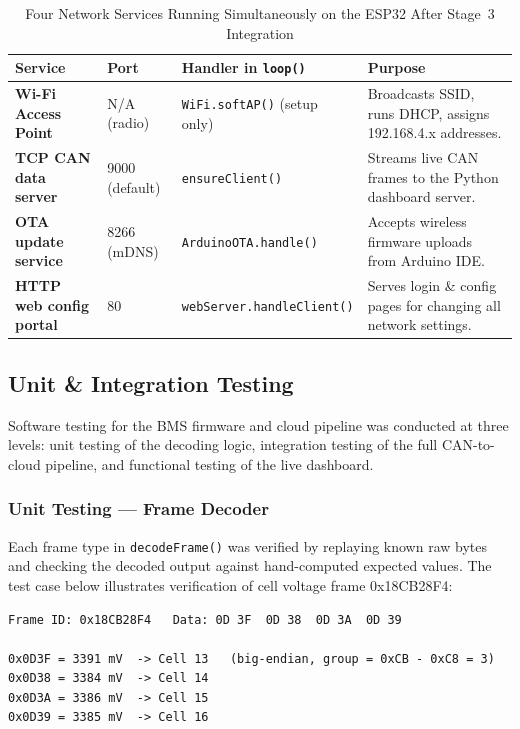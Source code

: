 \begin{table}[H]
\centering
\caption{Four Network Services Running Simultaneously on the ESP32 After Stage~3 Integration}
\label{tab:esp32-services}
\small
\begin{tabular}{>{\bfseries}p{3.0cm} p{1.5cm} p{3.0cm} p{5.0cm}}
\toprule
Service & Port & Handler in \texttt{loop()} & Purpose \\
\midrule
Wi-Fi Access Point  & N/A (radio)    & \texttt{WiFi.softAP()} (setup only)  & Broadcasts SSID, runs DHCP, assigns 192.168.4.x addresses. \\
TCP CAN data server & 9000 (default) & \texttt{ensureClient()}               & Streams live CAN frames to the Python dashboard server. \\
OTA update service  & 8266 (mDNS)    & \texttt{ArduinoOTA.handle()}          & Accepts wireless firmware uploads from Arduino IDE. \\
HTTP web config portal & 80          & \texttt{webServer.handleClient()}     & Serves login \& config pages for changing all network settings. \\
\bottomrule
\end{tabular}
\end{table}

\subsection{Unit \& Integration Testing}

Software testing for the BMS firmware and cloud pipeline was conducted at three levels: unit testing of the decoding logic, integration testing of the full CAN-to-cloud pipeline, and functional testing of the live dashboard.

\subsubsection{Unit Testing — Frame Decoder}

Each frame type in \texttt{decodeFrame()} was verified by replaying known raw bytes and checking the decoded output against hand-computed expected values. The test case below illustrates verification of cell voltage frame 0x18CB28F4:

\begin{verbatim}
Frame ID: 0x18CB28F4   Data: 0D 3F  0D 38  0D 3A  0D 39

0x0D3F = 3391 mV  -> Cell 13   (big-endian, group = 0xCB - 0xC8 = 3)
0x0D38 = 3384 mV  -> Cell 14
0x0D3A = 3386 mV  -> Cell 15
0x0D39 = 3385 mV  -> Cell 16
\end{verbatim}

